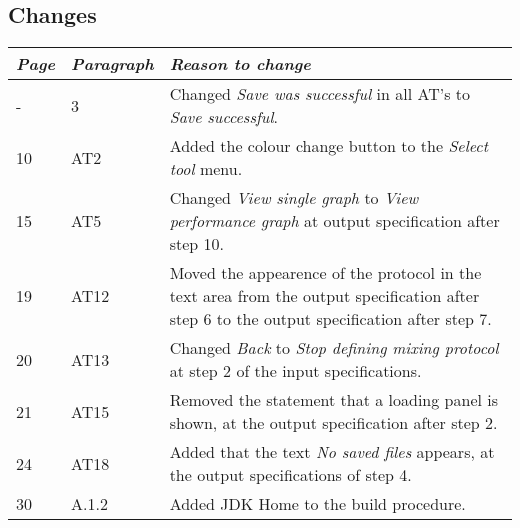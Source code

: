 \subsection*{Changes}
\begin{tabular}{lll}
    \toprule
    \emph{Page} & \emph{Paragraph} & \emph{Reason to change} \\
    \midrule
    - & 3 & Changed \emph{Save was successful} in all AT's to \emph{Save successful}. \\
    10 & AT2 & Added the colour change button to the \emph{Select tool} menu. \\
    15 & AT5 & Changed \emph{View single graph} to \emph{View performance graph} at output specification after step 10. \\
    19 & AT12 & Moved the appearence of the protocol in the text area from the output specification after step 6 to the output specification after step 7. \\
    20 & AT13 & Changed \emph{Back} to \emph{Stop defining mixing protocol} at step 2 of the input specifications. \\
    21 & AT15 & Removed the statement that a loading panel is shown, at the output specification after step 2. \\
    24 & AT18 & Added that the text \emph{No saved files} appears, at the output specifications of step 4.\\
    30 & A.1.2 & Added JDK Home to the build procedure.\\
    \bottomrule
\end{tabular}
